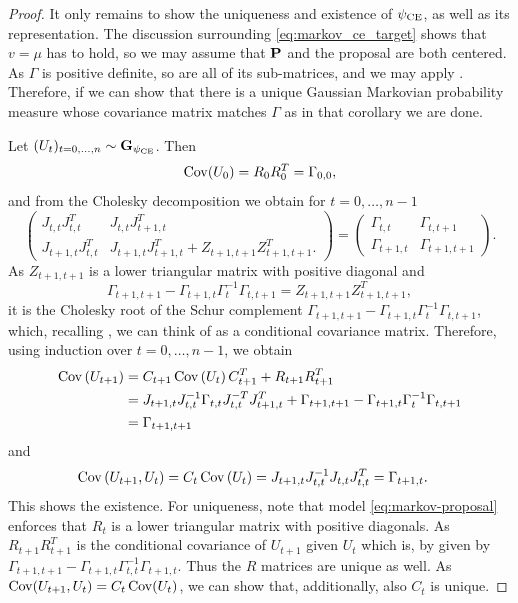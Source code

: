 \begin{proof}
    It only remains to show the uniqueness and existence of $\pce$, as well as its representation.
    The discussion surrounding \eqref{eq:markov_ce_target} shows that $v = \mu$ has to hold, so we may assume that $\P$ and the proposal are both centered.
    As $\Gamma$ is positive definite, so are all of its sub-matrices, and we may apply . Therefore, if we can show that there is a unique Gaussian Markovian probability measure whose covariance matrix matches $\Gamma$ as in that corollary we are done. 

    Let $(U_{t})_{t = 0, \dots, n} \sim \G_{\pce}$. Then 
    $$
        \cov (U_{0}) = R_{0}R_{0}^T = \Gamma_{0,0},
    $$
    and from the Cholesky decomposition we obtain for $t = 0, \dots, n - 1$
    $$
        \begin{pmatrix}
            J_{t,t}J_{t,t}^T & J_{t,t}J_{t + 1, t}^T\\
            J_{t +1, t}J_{t,t}^T & J_{t + 1, t}J_{t + 1, t}^{T} + Z_{t + 1, t + 1} Z_{t + 1, t + 1}^T.
        \end{pmatrix} = \begin{pmatrix}
            \Gamma_{t,t} & \Gamma_{t, t + 1} \\
            \Gamma_{t + 1, t} & \Gamma_{t + 1, t + 1}
        \end{pmatrix}.
    $$
    As $Z_{t + 1, t + 1}$ is a lower triangular matrix with positive diagonal and
    $$
        \Gamma_{t + 1, t + 1} - \Gamma_{t+1, t}\Gamma_{t}^{-1}\Gamma_{t, t +1} = Z_{t + 1, t + 1} Z_{t + 1, t + 1}^T,
    $$
    it is the Cholesky root of the Schur complement $\Gamma_{t + 1, t + 1} - \Gamma_{t+1, t}\Gamma_{t}^{-1}\Gamma_{t, t +1}$, which, recalling , we can think of as a conditional covariance matrix. 
    Therefore, using induction over $t = 0, \dots, n - 1$, we obtain
    \begin{align*}
        \cov \left( U_{t + 1} \right) &= C_{t + 1}\cov \left( U_{t} \right) C^T_{t + 1} + R_{t + 1}R_{t + 1}^T \\
            &= J_{t + 1, t}J_{t,t}^{-1}\Gamma_{t,t}J_{t,t}^{-T}J_{t+1,t}^T + \Gamma_{t + 1, t + 1} - \Gamma_{t+1, t}\Gamma_{t}^{-1}\Gamma_{t, t +1}\\
            &= \Gamma_{t + 1, t + 1}
    \end{align*}
    and
    \begin{align*}
        \cov \left( U_{t + 1}, U_{t} \right) &= C_{t}\cov \left( U_{t} \right) = J_{t + 1, t}J_{t,t}^{-1} J_{t,t} J_{t, t}^T = \Gamma_{t + 1, t}.
    \end{align*}
    This shows the existence. For uniqueness, note that model \eqref{eq:markov-proposal} enforces that $R_{t}$ is a lower triangular matrix with positive diagonals. As $R_{t + 1}R_{t + 1}^T$ is the conditional covariance of $U_{t + 1}$ given $U_{t}$ which is, by  given by $\Gamma_{t + 1, t + 1} - \Gamma_{t + 1, t}\Gamma_{t,t}^{-1}\Gamma_{t + 1, t}$. Thus the $R$ matrices are unique as well. As $\cov (U_{t + 1}, U_{t}) = C_{t}\cov (U_{t})$, we can show that, additionally, also $C_{t}$ is unique.
\end{proof}

